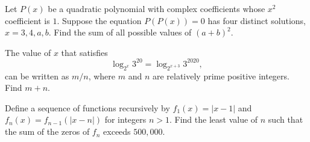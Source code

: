 %	














\begin{question}[name={2020 AIME I, \href{https://artofproblemsolving.com/community/c4p14284158}{Problem 14}}]
	Let $P(x)$ be a quadratic polynomial with complex coefficients whose $x^2$ coefficient is $1$. Suppose the equation $P(P(x))=0$ has four distinct solutions, $x=3,4,a,b$. Find the sum of all possible values of $(a+b)^2$.
\end{question}

%
%	
%






\begin{question}[name={2020 AIME II, \href{https://artofproblemsolving.com/community/c4p15681226}{Problem 3}}]
	The value of $x$ that satisfies $$\log_{2^x} 3^{20} = \log_{2^{x+3}} 3^{2020},$$ can be written as ${m}/{n}$, where $m$ and $n$ are relatively prime positive integers. Find $m+n$.	
\end{question}


%	













\begin{question}[name={2020 AIME II, \href{https://artofproblemsolving.com/community/c4p15681098}{Problem 8}}]
	Define a sequence of functions recursively by $f_1(x) = |x-1|$ and $f_n(x)=f_{n-1}(|x-n|)$ for integers $n > 1$. Find the least value of $n$ such that the sum of the zeros of $f_n$ exceeds $500{,}000$.
\end{question}


%	












